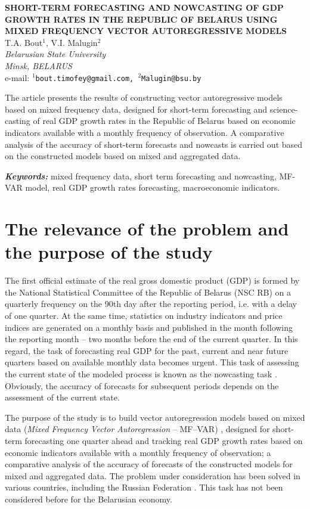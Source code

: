 \documentclass[12pt]{article}
\providecommand{\keywords}[1]
{
\vspace{2mm}\hspace{20pt}\textbf{\textit{Keywords:}} #1
}
\providecommand{\abskeyw}[2]
{
\begin{small}
\begin{adjustwidth}{10mm}{10mm}
\vspace{1mm}\hspace{20pt}#1

\keywords{#2}
\end{adjustwidth}
\end{small}
}
\begin{document}
\begin{center}
{\Large\bf SHORT-TERM FORECASTING AND NOWCASTING OF GDP GROWTH RATES IN THE REPUBLIC OF BELARUS USING MIXED FREQUENCY VECTOR AUTOREGRESSIVE MODELS}\\\vspace{2mm} {\sc T.A.
Bout$^1$, V.I. Malugin$^2$}\\\vspace{2mm}
{\it Belarusian State University\\
Minsk, BELARUS\\} e-mail: {\tt $^1$bout.timofey@gmail.com,
$^2$Malugin@bsu.by}

\abskeyw{The article presents the results of constructing vector autoregressive models based on mixed frequency data, designed for short-term forecasting and science-casting of real GDP growth rates in the Republic of Belarus based on economic indicators available with a monthly frequency of observation. A comparative analysis of the accuracy of short-term forecasts and nowcasts is carried out based on the constructed models based on mixed and aggregated data.}{mixed frequency data, short term forecasting and nowcasting, MF-VAR model, real GDP growth rates forecasting, macroeconomic indicators.}
\end{center}

\section{The relevance of the problem and the purpose of the study}

The first official estimate of the real gross domestic product (GDP) is formed by the National Statistical Committee of the Republic of Belarus (NSC RB) on a quarterly frequency on the 90th day after the reporting period, i.e. with a delay of one quarter. At the same time, statistics on industry indicators and price indices are generated on a monthly basis and published in the month following the reporting month – two months before the end of the current quarter. In this regard, the task of forecasting real GDP for the past, current and near future quarters based on available monthly data becomes urgent. This task of assessing the current state of the modeled process is known as the nowcasting task \cite{1}. Obviously, the accuracy of forecasts for subsequent periods depends on the assessment of the current state.

The purpose of the study is to build vector autoregression models based on mixed data (\textit{Mixed Frequency Vector Autoregression} -- MF–VAR) \cite{2}, designed for short-term forecasting one quarter ahead and tracking real GDP growth rates based on economic indicators available with a monthly frequency of observation; a comparative analysis of the accuracy of forecasts of the constructed models for mixed and aggregated data. The problem under consideration has been solved in various countries, including the Russian Federation \cite{4}. This task has not been considered before for the Belarusian economy.
\end{document}
